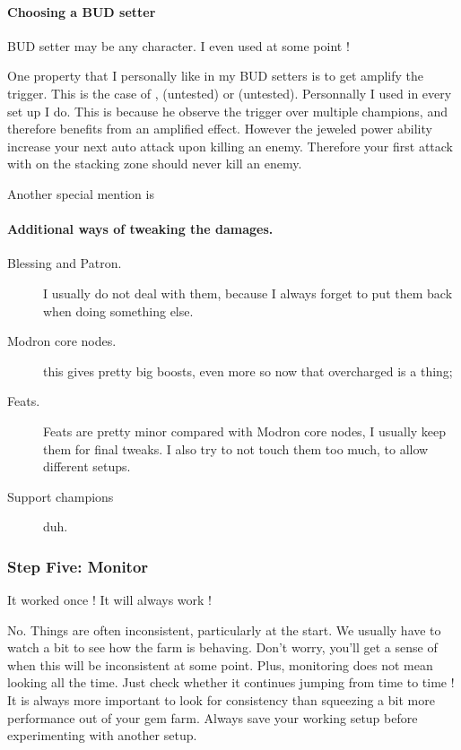 \documentclass{article}
\begin{document}
\paragraph{Choosing a BUD setter}
BUD setter may be any character.
I even used \nerys at some point !

One property that I personally like in my BUD setters is to get amplify the trigger.
This is the case of \artemis, \arkhan (untested) or \blackViper (untested).
Personnally I used \artemis in every set up I do.
This is because he observe the trigger over multiple champions, and therefore benefits from an amplified effect.
However the jeweled power ability increase your next auto attack upon killing an enemy.
Therefore your first attack with \artemis on the stacking zone should never kill an enemy.

Another special mention is \nahara

\paragraph{Additional ways of tweaking the damages.}

\begin{description}
    \item[Blessing and Patron.] I usually do not deal with them, because I always forget to put them back when doing something else.
    \item[Modron core nodes.] this gives pretty big boosts, even more so now that overcharged is a thing;
    \item[Feats.] Feats are pretty minor compared with Modron core nodes, I usually keep them for final tweaks.
    I also try to not touch them too much, to allow different setups.
    \item[Support champions] duh.
\end{description}


\subsubsection{Step Five: Monitor}
\label{sec:stepFive}

It worked once !\newline
It will always work !\newline

No.\newline
Things are often inconsistent, particularly at the start.
We usually have to watch a bit to see how the farm is behaving.
Don't worry, you'll get a sense of when this will be inconsistent at some point.
Plus, monitoring does not mean looking all the time.
Just check whether it continues jumping from time to time !
It is always more important to look for consistency than squeezing a bit more performance out of your gem farm.
Always save your working setup before experimenting with another setup.
\end{document}
